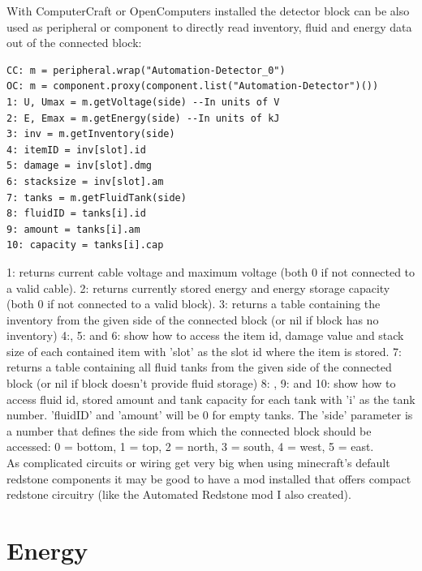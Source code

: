 \documentclass[11pt]{article} %
\begin{document}
With ComputerCraft or OpenComputers installed the detector block can be also used as peripheral or component to directly read inventory, fluid and energy data out of the connected block:
\begin{lstlisting}
CC: m = peripheral.wrap("Automation-Detector_0")
OC: m = component.proxy(component.list("Automation-Detector")())
1: U, Umax = m.getVoltage(side) --In units of V
2: E, Emax = m.getEnergy(side) --In units of kJ
3: inv = m.getInventory(side)
4: itemID = inv[slot].id
5: damage = inv[slot].dmg
6: stacksize = inv[slot].am
7: tanks = m.getFluidTank(side)
8: fluidID = tanks[i].id
9: amount = tanks[i].am
10: capacity = tanks[i].cap
\end{lstlisting}
1: returns current cable voltage and maximum voltage (both 0 if not connected to a valid cable). 2: returns currently stored energy and energy storage capacity (both 0 if not connected to a valid block). 3: returns a table containing the inventory from the given side of the connected block (or nil if block has no inventory) 4:, 5: and 6: show how to access the item id, damage value and stack size of each contained item with 'slot' as the slot id where the item is stored. 7: returns a table containing all fluid tanks from the given side of the connected block (or nil if block doesn't provide fluid storage) 8: , 9: and 10: show how to access fluid id, stored amount and tank capacity for each tank with 'i' as the tank number. 'fluidID' and 'amount' will be 0 for empty tanks. The 'side' parameter is a number that defines the side from which the connected block should be accessed: 0 = bottom, 1 = top, 2 = north, 3 = south, 4 = west, 5 = east.\\

As complicated circuits or wiring get very big when using minecraft's default redstone components it may be good to have a mod installed that offers compact redstone circuitry (like the Automated Redstone mod I also created).

\section{Energy}
\end{document}
